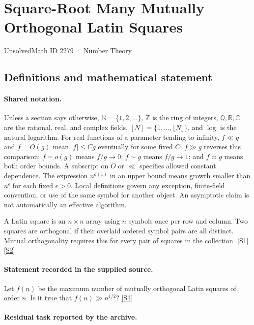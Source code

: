 \documentclass[11pt,a4paper]{article}
\newcommand{\N}{\mathbb{N}}
\newcommand{\Z}{\mathbb{Z}}
\newcommand{\Q}{\mathbb{Q}}
\newcommand{\R}{\mathbb{R}}
\newcommand{\C}{\mathbb{C}}
\newcommand{\sref}[2]{\hyperlink{source:#1:#2}{[S#2]}}
\begin{document}

\setcounter{section}{2278}

\section{Square-Root Many Mutually Orthogonal Latin Squares}\label{2279}

{\small\sffamily UnsolvedMath ID 2279 · Number Theory}

\subsection{Definitions and mathematical statement}

\paragraph{Shared notation.}Unless a section says otherwise, $\N=\{1,2,\ldots\}$,
$\Z$ is the ring of integers, $\Q,\R,\C$ are the rational, real, and complex
fields, $[N]=\{1,\ldots,\lfloor N\rfloor\}$, and $\log$ is the natural
logarithm. For real functions of a parameter tending to infinity,
$f\ll g$ and $f=O(g)$ mean $|f|\leq Cg$ eventually for some fixed $C$;
$f\gg g$ reverses this comparison; $f=o(g)$ means $f/g\to0$;
$f\sim g$ means $f/g\to1$; and $f\asymp g$ means both order bounds.
A subscript on $O$ or $\ll$ specifies allowed constant dependence.
The expression $n^{o(1)}$ in an upper bound means growth smaller than
$n^\epsilon$ for each fixed $\epsilon>0$. Local definitions govern any
exception, finite-field convention, or use of the same symbol for another
object. An asymptotic claim is not automatically an effective algorithm.



A Latin square is an $n\times n$ array using $n$ symbols once per row and column. Two squares are orthogonal if their overlaid ordered symbol pairs are all distinct. Mutual orthogonality requires this for every pair of squares in the collection. \sref{2279}{1} \sref{2279}{2}

\paragraph{Statement recorded in the supplied source.}
Let $f(n)$ be the maximum number of mutually orthogonal Latin squares of order $n$. Is it true that $ f(n) \gg n^{1/2}? $ \sref{2279}{1}

\paragraph{Residual task reported by the archive.}
\end{document}
